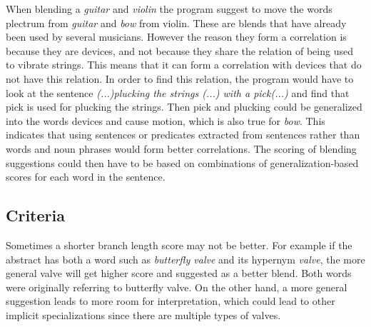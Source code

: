 

When blending a \emph{guitar} and \emph{violin} the program suggest to move the words plectrum from \emph{guitar} and \emph{bow} from violin. These are blends that have already been used by several musicians. However the reason they form a correlation is because they are devices, and not because they share the relation of being used to vibrate strings. This means that it can form a correlation with devices that do not have this relation. In order to find this relation, the program would have to look at the sentence \emph{(...)plucking the strings (...) with a pick(...)} and find that pick is used for plucking the strings. Then pick and plucking could be generalized into the words devices and cause motion, which is also true for \emph{bow}. This indicates that using sentences or predicates extracted from sentences rather than words and noun phrases would form better correlations. The scoring of blending suggestions could then have to be based on combinations of generalization-based scores for each word in the sentence.



\subsection{Criteria}
Sometimes a shorter branch length score may not be better. For example if the abstract has both a word such as \emph{butterfly valve} and its hypernym \emph{valve}, the more general valve will get higher score and suggested as a better blend. Both words were originally referring to butterfly valve. On the other hand, a more general suggestion leads to more room for interpretation, which could lead to other implicit specializations since there are multiple types of valves. %

